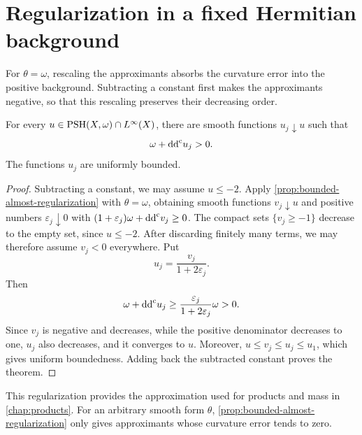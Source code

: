 \section{Regularization in a fixed Hermitian background}

For $\theta=\omega$, rescaling the approximants absorbs the curvature error into the positive background. Subtracting a constant first makes the approximants negative, so that this rescaling preserves their decreasing order.

\begin{theorem}\label{thm:bounded-exact-regularization}
For every $u\in\mathrm{PSH}(X,\omega)\cap L^\infty(X)$, there are smooth functions $u_j\downarrow u$ such that
\[
 \omega+\mathrm{dd}^{\mathrm{c}} u_j>0.
\]
The functions $u_j$ are uniformly bounded.
\end{theorem}
\begin{proof}
Subtracting a constant, we may assume $u\leq-2$. Apply \cref{prop:bounded-almost-regularization} with $\theta=\omega$, obtaining smooth functions $v_j\downarrow u$ and positive numbers $\varepsilon_j\downarrow0$ with $(1+\varepsilon_j)\omega+\mathrm{dd}^{\mathrm{c}} v_j\geq0$. The compact sets $\{v_j\geq-1\}$ decrease to the empty set, since $u\leq-2$. After discarding finitely many terms, we may therefore assume $v_j<0$ everywhere. Put
\[
 u_j=\frac{v_j}{1+2\varepsilon_j}.
\]
Then
\[
 \omega+\mathrm{dd}^{\mathrm{c}} u_j
 \geq\frac{\varepsilon_j}{1+2\varepsilon_j}\omega>0.
\]
Since $v_j$ is negative and decreases, while the positive denominator decreases to one, $u_j$ also decreases, and it converges to $u$. Moreover, $u\leq v_j\leq u_j\leq u_1$, which gives uniform boundedness. Adding back the subtracted constant proves the theorem.
\end{proof}

This regularization provides the approximation used for products and mass in \cref{chap:products}. For an arbitrary smooth form $\theta$, \cref{prop:bounded-almost-regularization} only gives approximants whose curvature error tends to zero.
